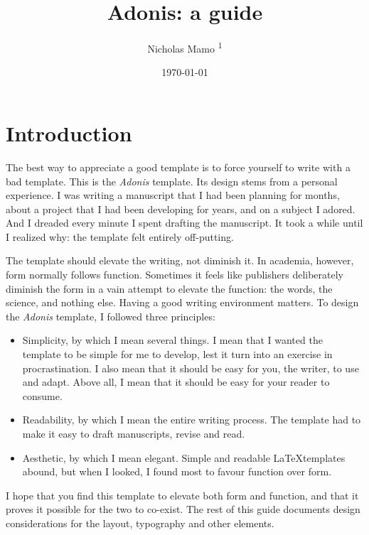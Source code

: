 \documentclass{adonis}
\title{Adonis: a guide}
\author{Nicholas Mamo \textsuperscript{1}}
\affiliation{\textsuperscript{1} Independent}
\date{\today}
\begin{document}
	\maketitle
	
	\section{Introduction}
	
		The best way to appreciate a good template is to force yourself to write with a bad template.
		This is the \textit{Adonis} template.
		Its design stems from a personal experience.
		I was writing a manuscript that I had been planning for months, about a project that I had been developing for years, and on a subject I adored.
		And I dreaded every minute I spent drafting the manuscript.
		It took a while until I realized why: the template felt entirely off-putting.
		
		The template should elevate the writing, not diminish it.
		In academia, however, form normally follows function.
		Sometimes it feels like publishers deliberately diminish the form in a vain attempt to elevate the function: the words, the science, and nothing else.
		Having a good writing environment matters.
		To design the \textit{Adonis} template, I followed three principles:
		
		\begin{itemize}
			\item Simplicity, by which I mean several things.
				  I mean that I wanted the template to be simple for me to develop, lest it turn into an exercise in procrastination.
				  I also mean that it should be easy for you, the writer, to use and adapt.
				  Above all, I mean that it should be easy for your reader to consume.
			
			\item Readability, by which I mean the entire writing process.
				  The template had to make it easy to draft manuscripts, revise and read.
			
			\item Aesthetic, by which I mean elegant.
				  Simple and readable \LaTeX templates abound, but when I looked, I found most to favour function over form.
		\end{itemize}
	
		I hope that you find this template to elevate both form and function, and that it proves it possible for the two to co-exist.
		The rest of this guide documents design considerations for the layout, typography and other elements.
	
\end{document}
